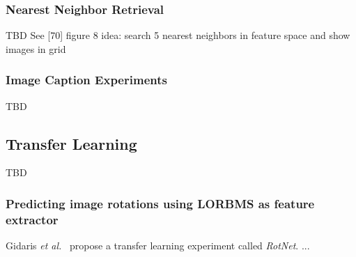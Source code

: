 \documentclass[12pt,a4paper]{article}
\begin{document}


\subsubsection{Nearest Neighbor Retrieval}
TBD
See [70] figure 8
idea: search 5 nearest neighbors in feature space and show images in grid

\subsubsection{Image Caption Experiments}
TBD


\subsection{Transfer Learning} %
TBD
\subsubsection{Predicting image rotations using LORBMS as feature extractor}\label{subsec:predRotnet}
Gidaris \textit{et al.}~\cite{RotNet} propose a transfer learning experiment called \textit{RotNet}. ...
\end{document}
